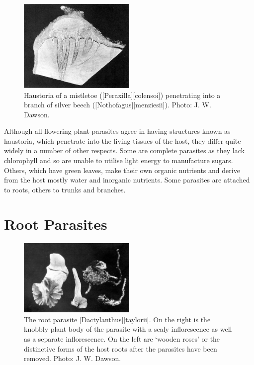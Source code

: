 \begin{figure}
	\includegraphics[width=0.5\textwidth]{graphics/figure57mistletoe-haustoria.jpg}
	\centering
	\caption[Haustoria of a mistletoe]{Haustoria of a mistletoe ([Peraxilla][colensoi]) penetrating into a branch of silver beech ([Nothofagus][menziesii]).
	Photo: J. W. Dawson.}%
	\label{fig:57mistletoe-haustori}
\end{figure}

Although all flowering plant parasites agree in having structures known as haustoria, which penetrate into the living tissues of the host, they differ quite widely in a number of other respects.
Some are complete parasites as they lack chlorophyll and so are unable to utilise light energy to manufacture sugars.
Others, which have green leaves, make their own organic nutrients and derive from the host mostly water and inorganic nutrients.
Some parasites are attached to roots, others to trunks and branches.

\section{Root Parasites}

\begin{figure}
	\includegraphics[width=0.5\textwidth]{graphics/figure58dactylanthus.jpg}
	\centering
	\caption[The root parasite \emph{Dactylanthus taylorii}]{The root parasite [Dactylanthus][taylorii].
	On the right is the knobbly plant body of the parasite with a scaly inflorescence as well as a separate inflorescence.
	On the left are `wooden roses' or the distinctive forms of the host roots after the parasites have been removed.
	Photo: J. W. Dawson.}%
	\label{fig:58dactylanthus}
\end{figure}

